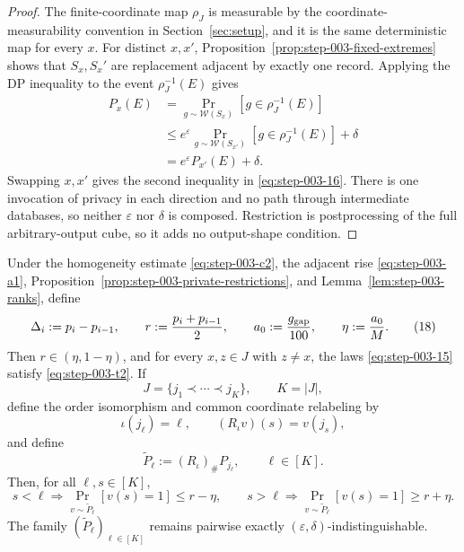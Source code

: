 \begin{proof}

The finite-coordinate map \(\rho_J\) is measurable by the coordinate-measurability convention in Section~\ref{sec:setup}, and it is the same deterministic map for every \(x\). For distinct \(x,x'\), Proposition~\ref{prop:step-003-fixed-extremes} shows that \(S_x,S_x'\) are replacement adjacent by exactly one record. Applying the DP inequality to the event \(\rho_J^{-1}(E)\) gives
\[
\begin{aligned}
P_x(E)
&=\Pr_{g\sim\mathcal W(S_x)}[g\in\rho_J^{-1}(E)]\\
&\le e^\varepsilon
\Pr_{g\sim\mathcal W(S_{x'})}[g\in\rho_J^{-1}(E)]
+\delta\\
&=e^\varepsilon P_{x'}(E)+\delta.
\end{aligned}
\tag{17}\label{eq:step-003-17}
\]
Swapping \(x,x'\) gives the second inequality in \eqref{eq:step-003-16}. There is one invocation of privacy in each direction and no path through intermediate databases, so neither \(\varepsilon\) nor \(\delta\) is composed. Restriction is postprocessing of the full arbitrary-output cube, so it adds no output-shape condition.

\end{proof}


\begin{proposition}
\label{prop:step-003-margin}

Under the homogeneity estimate \eqref{eq:step-003-c2}, the adjacent rise \eqref{eq:step-003-a1}, Proposition~\ref{prop:step-003-private-restrictions}, and Lemma~\ref{lem:step-003-ranks}, define
\[
\Delta_i:=p_i-p_{i-1},
\qquad
r:=\frac{p_i+p_{i-1}}2,
\qquad
a_0:=\frac{g_{\rm gap}}{100},
\qquad
\eta:=\frac{a_0}{M}.
\tag{18}\label{eq:step-003-18}
\]
Then \(r \in (\eta,1-\eta)\), and for every \(x,z \in J\) with \(z \ne  x\), the laws \eqref{eq:step-003-15} satisfy \eqref{eq:step-003-t2}. If
\[
J=\{j_1\prec\cdots\prec j_K\},
\qquad K=|J|,
\tag{19}\label{eq:step-003-19}
\]
define the order isomorphism and common coordinate relabeling by
\[
\iota(j_\ell)=\ell,
\qquad
(R_\iota v)(s)=v(j_s),
\tag{19a}\label{eq:step-003-19a}
\]
and define
\[
\widetilde P_\ell:=(R_\iota)_\# P_{j_\ell},
\qquad \ell\in[K].
\tag{19b}\label{eq:step-003-19b}
\]
Then, for all \(\ell,s \in [K]\),
\[
s<\ell
\Longrightarrow
\Pr_{v\sim\widetilde P_\ell}[v(s)=1]\le r-\eta,
\qquad
s>\ell
\Longrightarrow
\Pr_{v\sim\widetilde P_\ell}[v(s)=1]\ge r+\eta.
\tag{20}\label{eq:step-003-20}
\]
The family \((\widetilde P_\ell)_{\ell\in[K]}\) remains pairwise exactly \((\varepsilon,\delta)\)-indistinguishable.

\end{proposition}

